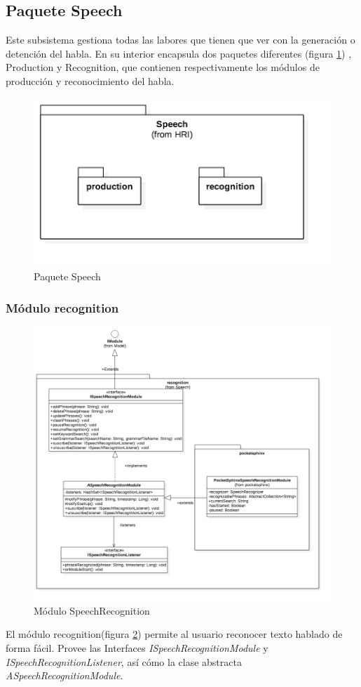\subsection{Paquete Speech}
\label{subsec:speech-package}
Este subsistema gestiona todas las labores que tienen que ver con la generación o detención del habla. En su interior encapsula dos paquetes diferentes (figura \ref{fig:speech-package}) , Production y Recognition, que contienen respectivamente los módulos de producción y reconocimiento del habla.
\begin{figure}
	\centering
	\includegraphics[width=0.8\linewidth]{imagenes/diagramas/Speech.png}
	\caption{Paquete Speech}
	\label{fig:speech-package}
\end{figure}

\subsubsection{Módulo recognition}
\begin{figure}
	\centering
	\includegraphics[width=1\linewidth]{imagenes/diagramas/SpeechRecognitionModule.png}
	\caption{Módulo SpeechRecognition}
	\label{fig:speech-recognition-module}
\end{figure}
El módulo recognition(figura \ref{fig:speech-recognition-module}) permite al usuario reconocer texto hablado de forma fácil.
Provee las Interfaces \textit{ISpeechRecognitionModule} y \textit{ISpeechRecognitionListener}, así cómo la clase abstracta \textit{ASpeechRecognitionModule}.


